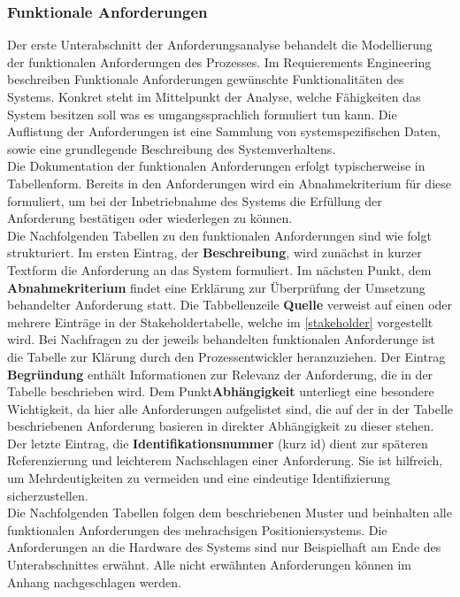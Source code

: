 \documentclass[../Bachelorarbeit.tex]{subfiles}
\begin{document}
\subsubsection{Funktionale Anforderungen}
Der erste Unterabschnitt der Anforderungsanalyse behandelt die Modellierung der funktionalen Anforderungen des Prozesses. Im Requierements Engineering beschreiben Funktionale Anforderungen gewünschte Funktionalitäten des Systems. Konkret steht im Mittelpunkt der Analyse, welche Fähigkeiten das System besitzen soll \bzw was es umgangssprachlich formuliert tun kann. Die Auflistung der Anforderungen ist eine Sammlung von systemspezifischen Daten, sowie eine grundlegende Beschreibung des Systemverhaltens. \\ %
Die Dokumentation der funktionalen Anforderungen erfolgt typischerweise in Tabellenform. Bereits in den Anforderungen wird ein Abnahmekriterium für diese formuliert, um bei der Inbetriebnahme des Systems die Erfüllung der Anforderung bestätigen oder wiederlegen zu können.\\ %
Die Nachfolgenden Tabellen zu den funktionalen Anforderungen sind wie folgt strukturiert. Im ersten Eintrag, der \textbf{Beschreibung}, wird zunächst in kurzer Textform die Anforderung an das System formuliert. Im nächsten Punkt, dem \textbf{Abnahmekriterium} findet eine Erklärung zur Überprüfung der Umsetzung behandelter Anforderung statt. Die Tabbellenzeile \textbf{Quelle} verweist auf einen oder mehrere Einträge in der Stakeholdertabelle, welche im \autoref{stakeholder} vorgestellt wird. Bei Nachfragen zu der jeweils behandelten funktionalen Anforderunge ist die Tabelle zur Klärung durch den Prozessentwickler heranzuziehen. Der Eintrag \textbf{Begründung} enthält Informationen zur Relevanz der Anforderung, die in der Tabelle beschrieben wird. Dem Punkt\textbf{Abhängigkeit} unterliegt eine besondere Wichtigkeit, da hier alle Anforderungen aufgelistet sind, die auf der in der Tabelle beschriebenen Anforderung basieren \bzw in direkter Abhängigkeit zu dieser stehen. Der letzte Eintrag, die \textbf{Identifikationsnummer} (kurz \acs{id}) dient zur späteren Referenzierung und leichterem Nachschlagen einer Anforderung. Sie ist hilfreich, um Mehrdeutigkeiten zu vermeiden und eine eindeutige Identifizierung sicherzustellen.\\ %
Die Nachfolgenden Tabellen folgen dem beschriebenen Muster und beinhalten alle funktionalen Anforderungen des mehrachsigen Positioniersystems. Die Anforderungen an die Hardware des Systems sind nur Beispielhaft am Ende des Unterabschnittes erwähnt. Alle nicht erwähnten Anforderungen können im Anhang nachgeschlagen werden.
\end{document}
